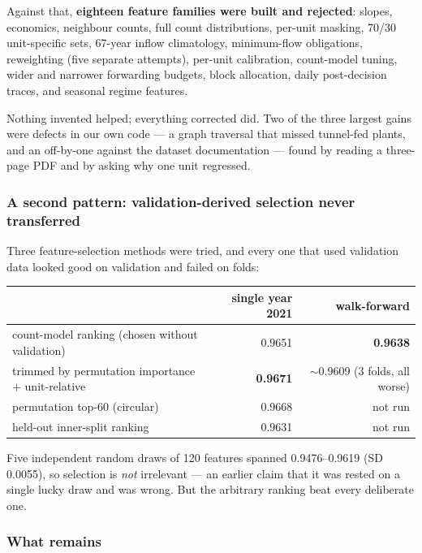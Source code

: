 Against that, \textbf{eighteen feature families were built and rejected}: slopes, economics,
neighbour counts, full count distributions, per-unit masking, 70/30 unit-specific sets, 67-year
inflow climatology, minimum-flow obligations, reweighting (five separate attempts), per-unit
calibration, count-model tuning, wider and narrower forwarding budgets, block allocation, daily
post-decision traces, and seasonal regime features.

\begin{finding}
Nothing invented helped; everything corrected did. Two of the three largest gains were defects in
our own code --- a graph traversal that missed tunnel-fed plants, and an off-by-one against the
dataset documentation --- found by reading a three-page PDF and by asking why one unit regressed.
\end{finding}

\subsubsection*{A second pattern: validation-derived selection never transferred}

Three feature-selection methods were tried, and every one that used validation data looked good on
validation and failed on folds:

\begin{center}\small
\begin{tabular}{lrr}
\toprule
& single year 2021 & walk-forward \\
\midrule
count-model ranking (chosen without validation) & 0.9651 & \textbf{0.9638} \\
trimmed by permutation importance $+$ unit-relative & \textbf{0.9671} & $\sim$0.9609 (3 folds, all worse) \\
permutation top-60 (circular) & 0.9668 & not run \\
held-out inner-split ranking & 0.9631 & not run \\
\bottomrule
\end{tabular}
\end{center}

Five independent random draws of 120 features spanned 0.9476--0.9619 (SD 0.0055), so selection is
\emph{not} irrelevant --- an earlier claim that it was rested on a single lucky draw and was
wrong. But the arbitrary ranking beat every deliberate one.

\subsubsection*{What remains}


